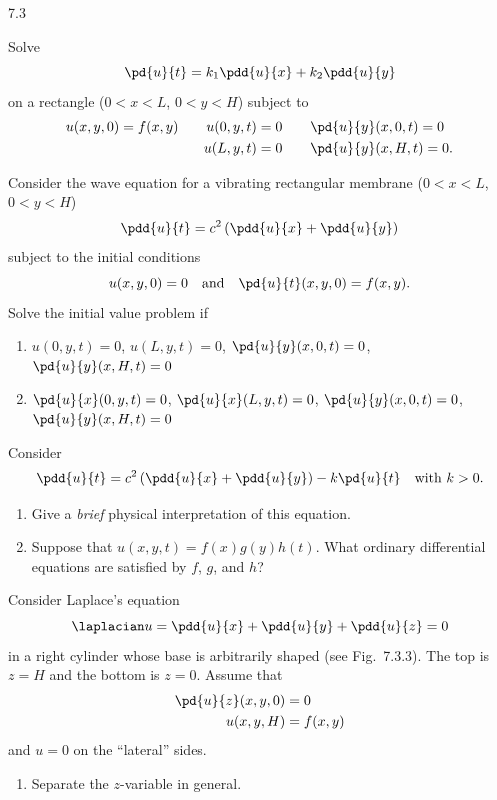 \begin{exercises}{7.3}
\item Solve
\[
\pd{u}{t} = k_1\pdd{u}{x} + k_2\pdd{u}{y}
\]
on a rectangle ($0 < x < L$, $0 < y < H$) subject to
\[
\begin{aligned}
u(x,y,0) = f(x,y) \qquad u(0,y,t) &= 0 \qquad \pd{u}{y}(x,0,t) = 0 \\
u(L,y,t) &= 0 \qquad \pd{u}{y}(x,H,t) = 0.
\end{aligned}
\]

\item Consider the wave equation for a vibrating rectangular membrane ($0 < x < L$, $0 < y < H$)
\[
\pdd{u}{t} = c^2\left(\pdd{u}{x} + \pdd{u}{y}\right)
\]
subject to the initial conditions
\[
u(x,y,0) = 0 \quad\text{and}\quad \pd{u}{t}(x,y,0) = f(x,y).
\]
Solve the initial value problem if

\begin{enumerate}
\item[(a)] $u(0,y,t) = 0$, \quad $u(L,y,t) = 0$, \quad $\pd{u}{y}(x,0,t) = 0$, \quad $\pd{u}{y}(x,H,t) = 0$

\item[\starred(b)] $\pd{u}{x}(0,y,t) = 0$, \quad $\pd{u}{x}(L,y,t) = 0$, \quad $\pd{u}{y}(x,0,t) = 0$, \quad $\pd{u}{y}(x,H,t) = 0$
\end{enumerate}

\item Consider
\[
\pdd{u}{t} = c^2\left(\pdd{u}{x} + \pdd{u}{y}\right) - k\pd{u}{t} \quad\text{with } k > 0.
\]

\begin{enumerate}
\item[(a)] Give a \emph{brief} physical interpretation of this equation.

\item[(b)] Suppose that $u(x,y,t) = f(x)g(y)h(t)$.  What ordinary differential equations are satisfied by $f$, $g$, and $h$?
\end{enumerate}

\item Consider Laplace's equation
\[
\laplacian u = \pdd{u}{x} + \pdd{u}{y} + \pdd{u}{z} = 0
\]
in a right cylinder whose base is arbitrarily shaped (see Fig.~7.3.3).  The top is $z = H$ and the bottom is $z = 0$.  Assume that
\[
\begin{aligned}
\pd{u}{z}(x,y,0) &= 0 \\
u(x,y,H) &= f(x,y)
\end{aligned}
\]
and $u = 0$ on the ``lateral'' sides.

\begin{enumerate}
\item[(a)] Separate the $z$-variable in general.


\end{enumerate}
\end{exercises}
